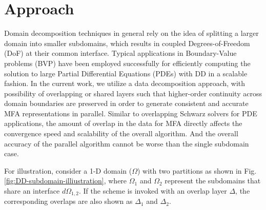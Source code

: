 \documentclass[conference]{IEEEtran}
\begin{document}
\section{Approach}

Domain decomposition techniques in general rely on the idea of splitting a larger domain into smaller subdomains, which results in coupled Degrees-of-Freedom (DoF) at their common interface. Typical applications in Boundary-Value problems (BVP) \cite{smith-ddm, lions-asm} have been employed successfully for efficiently computing the solution to large Partial Differential Equations (PDEs) with DD in a scalable fashion. In the current work, we utilize a data decomposition approach, with possibility of overlapping or shared layers such that higher-order continuity across domain boundaries are preserved in order to generate consistent and accurate MFA representations in parallel. Similar to overlapping Schwarz solvers for PDE applications, the amount of overlap in the data for MFA directly affects the convergence speed and scalability of the overall algorithm. And the overall accuracy of the parallel algorithm cannot be worse than the single subdomain case.

For illustration, consider a 1-D domain ($\Omega$) with two partitions as shown in Fig. \ref{fig:DD-subdomain-illiustration}, where $\Omega_1$ and $\Omega_2$ represent the subdomains that share an interface $d\Omega_{1,2}$. If the scheme is invoked with an overlap layer $\Delta$, the corresponding overlaps are also shown as $\Delta_1$ and $\Delta_2$.

\end{document}

